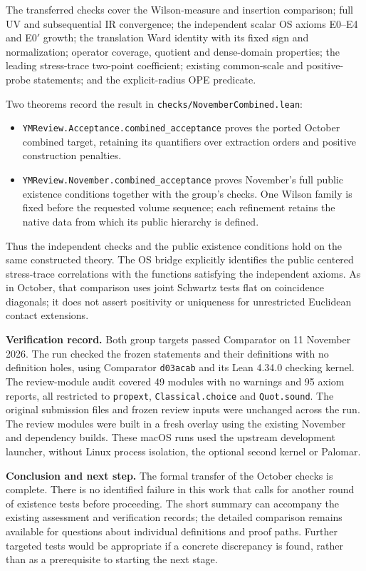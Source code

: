 \documentclass[11pt]{article}
\newcommand{\code}[1]{{\small\nolinkurl{#1}}}
\begin{document}
The transferred checks cover the Wilson-measure and insertion comparison;
full UV and subsequential IR convergence; the independent scalar OS axioms
E0--E4 and E0$'$ growth; the translation Ward identity with its fixed sign
and normalization; operator coverage, quotient and dense-domain properties;
the leading stress-trace two-point coefficient; existing common-scale and
positive-probe statements; and the explicit-radius OPE predicate.

Two theorems record the result in \code{checks/NovemberCombined.lean}:
\begin{itemize}
\item \code{YMReview.Acceptance.combined_acceptance} proves the ported October
combined target, retaining its quantifiers over extraction orders and
positive construction penalties.
\item \code{YMReview.November.combined_acceptance} proves November's full
public existence conditions together with the group's checks. One Wilson
family is fixed before the requested volume sequence; each refinement
retains the native data from which its public hierarchy is defined.
\end{itemize}
Thus the independent checks and the public existence conditions hold on
the same constructed theory. The OS bridge explicitly identifies the
public centered stress-trace correlations with the functions satisfying
the independent axioms. As in October, that comparison uses joint Schwartz
tests flat on coincidence diagonals; it does not assert positivity or
uniqueness for unrestricted Euclidean contact extensions.

\textbf{Verification record.}
Both group targets passed Comparator on 11 November 2026. The run checked
the frozen statements and their definitions with no definition holes,
using Comparator \code{d03acab} and its Lean 4.34.0 checking kernel. The
review-module audit covered 49 modules with no warnings and 95 axiom
reports, all restricted to \code{propext}, \code{Classical.choice} and
\code{Quot.sound}. The original submission files and frozen review inputs
were unchanged across the run. The review modules were built in a fresh
overlay using the existing November and dependency builds. These macOS
runs used the upstream development launcher, without Linux process
isolation, the optional second kernel or Palomar.

\textbf{Conclusion and next step.}
The formal transfer of the October checks is complete. There is no
identified failure in this work that calls for another round of existence
tests before proceeding. The short summary can accompany the existing
assessment and verification records; the detailed comparison remains
available for questions about individual definitions and proof paths.
Further targeted tests would be appropriate if a concrete discrepancy is
found, rather than as a prerequisite to starting the next stage.
\end{document}
